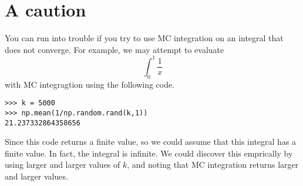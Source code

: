 \section*{A caution}
You can run into trouble if you try to use MC integration on an integral that does not converge.
For example, we may attempt to evaluate
\[
\int_0^1 \frac{1}{x}
\]
with MC integragtion using the following code.
\begin{lstlisting}
>>> k = 5000
>>> np.mean(1/np.random.rand(k,1))
21.237332864358656
\end{lstlisting}

Since this code returns a finite value, so we could assume that this integral has a finite value.
In fact, the integral is infinite.
We could discover this emprically by using larger and larger values of $k$, and noting that MC integration returns larger and larger values.


\begin{comment}
\begin{problem}
\label{prob:mc_flawed}
Create a new function (based upon the function from Problem \ref{prob:mc}) that uses a ``flawed'' random number generator that doesn't produce numbers between $-.95$ and $-1$. Test your method on the function from Problem \ref{prob:mc_test}. How bad is the error? 
\end{problem}
\end{comment}
